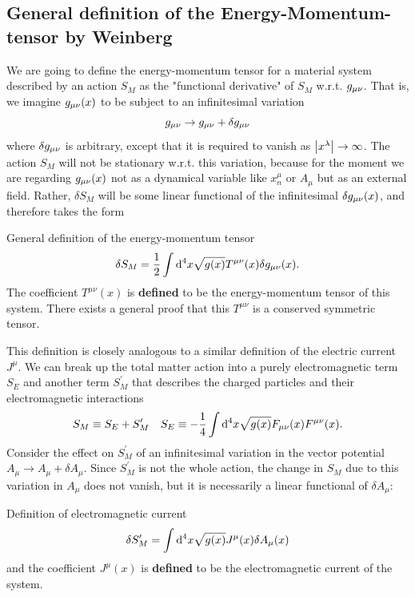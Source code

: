 \subsection{General definition of the Energy-Momentum-tensor by Weinberg}
We are going to define the energy-momentum tensor for a material system described by an action $S_M$ as the "functional derivative" of $S_M$ w.r.t. $g_{\mu \nu}$. That is, we imagine $g_{\mu \nu}(x)$ to be subject to an infinitesimal variation
\begin{equation}
	g_{\mu \nu} \rightarrow g_{\mu \nu} +  \delta g_{\mu \nu}
\end{equation}
where $\delta g_{\mu \nu}$ is arbitrary, except that it is required to vanish as $\abs{x^\lambda}\rightarrow\infty$. The action $S_M$ will not be stationary w.r.t. this variation, because for the moment we are regarding $g_{\mu \nu}(x)$ not as a dynamical variable like $x^\mu_n$ or $A_\mu$ but as an external field. Rather, $\delta S_M$ will be some linear functional of the infinitesimal $\delta g_{\mu \nu}(x)$, and therefore takes the form
\begin{mybox}{General definition of the energy-momentum tensor}
\begin{equation}
\label{eq:EnergyMomentumTensorWeinberg}
	\delta S_M = \frac{1}{2} \int \mathrm{d}^4 x \sqrt{g(x)} T^{\mu \nu} (x) \delta g_{\mu \nu}(x).
\end{equation}
The coefficient $T^{\mu \nu}(x)$ is \textbf{defined} to be the energy-momentum tensor of this system. There exists a general proof that this $T^{\mu \nu}$ is a conserved symmetric tensor. 
\end{mybox}
This definition is closely analogous to a similar definition of the electric current $J^\mu$. We can break up the total matter action into a purely electromagnetic term $S_E$ and another term $S^\prime_M$ that describes the charged particles and their electromagnetic interactions
\begin{equation}
	S_M\equiv S_E+S^\prime_M \quad S_E \equiv -\frac{1}{4} \int \mathrm{d}^4 x \sqrt{g(x)} F_{\mu \nu}(x) F^{\mu \nu}(x).
\end{equation}
Consider the effect on $S^\prime_M$ of an infinitesimal variation in the vector potential $A_\mu \rightarrow A_\mu + \delta A_\mu$.
Since $S^\prime_M$ is not the whole action, the change in $S_M$ due to this variation in $A_\mu$ does not vanish, but it is necessarily a linear functional of $\delta A_\mu$:
\begin{mybox}{Definition of electromagnetic current}
	\begin{equation}
	\label{eq:electromagneticcurrent}
		\delta S^\prime_M = \int \mathrm{d}^4 x \sqrt{g(x)} J^\mu(x) \delta A_\mu(x)
	\end{equation}
	and the coefficient $J^\mu(x)$ is \textbf{defined} to be the electromagnetic current of the system.
\end{mybox}
